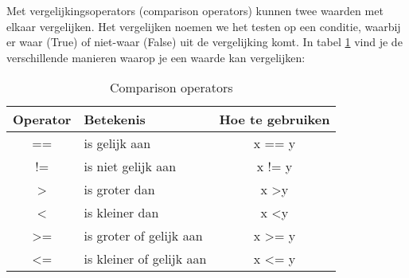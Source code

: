 Met vergelijkingsoperators (comparison operators) kunnen twee waarden met elkaar vergelijken. Het vergelijken noemen we het testen op een conditie, waarbij er waar (True) of niet-waar (False) uit de vergelijking komt. In tabel \ref{table:compop} vind je de verschillende manieren waarop je een waarde kan vergelijken:
\begin{flushleft}
\begin{table}[h!]
\centering
	\begin{tabularx}{\textwidth}{ |c|X|c| }
\hline
	Operator &
	Betekenis &
	Hoe te gebruiken \\
\hline
	==\index{operator!==} &
	is gelijk aan\index{gelijk aan} &
	x == y \\
\hline
	!=\index{operator!"!=} &
	is niet gelijk aan\index{niet gelijk aan} &
	x != y 	\\
\hline
	\textgreater\index{operator!>} &
	is groter dan\index{groter dan} &
	x \textgreater y \\
\hline
	\textless\index{operator!<} &
	is kleiner dan\index{kleiner dan} &
	x \textless y \\
\hline
	\textgreater=\index{operator!>=} &
	is groter of gelijk aan\index{groter of gelijk aan} &
	x \textgreater= y \\
\hline
	\textless=\index{operator!<=} &
	is kleiner of gelijk aan\index{kleiner of gelijk aan} &
	x \textless= y \\
\hline
\end{tabularx}
\caption{Comparison operators}
\label{table:compop}
\end{table}
\end{flushleft}

